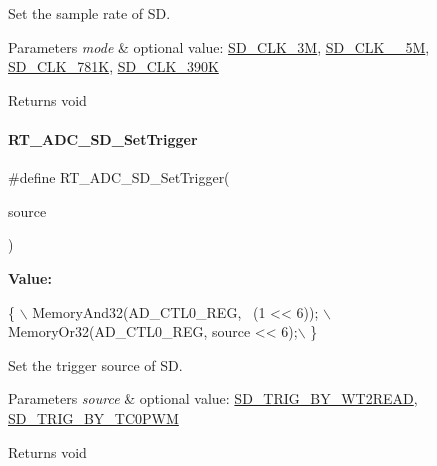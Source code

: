 Set the sample rate of SD. 


\begin{DoxyParams}{Parameters}
{\em mode} & optional value\+: \mbox{\hyperlink{a00002_aebc3424fa91b715741f0320561ecfbb0a720c5991be73063f5ab035440f26b486}{S\+D\+\_\+\+C\+L\+K\+\_\+3M}}, \mbox{\hyperlink{a00002_aebc3424fa91b715741f0320561ecfbb0a5241c8457df3f987f10797b36db20771}{S\+D\+\_\+\+C\+L\+K\+\_\+\_\+5M}}, \mbox{\hyperlink{a00002_aebc3424fa91b715741f0320561ecfbb0a37bbada3115f676b49cc087c5caac0d3}{S\+D\+\_\+\+C\+L\+K\+\_\+781K}}, \mbox{\hyperlink{a00002_aebc3424fa91b715741f0320561ecfbb0ace583ebd6e97c856a883187711ea4226}{S\+D\+\_\+\+C\+L\+K\+\_\+390K}} \\
\hline
\end{DoxyParams}
\begin{DoxyReturn}{Returns}
void 
\end{DoxyReturn}
\mbox{\label{a00002_a11bf38478bd196acd1f179115e714dfc}} 
\paragraph{\texorpdfstring{R\+T\+\_\+\+A\+D\+C\+\_\+\+S\+D\+\_\+\+Set\+Trigger}{RT\_ADC\_SD\_SetTrigger}}
{\footnotesize\ttfamily \#define R\+T\+\_\+\+A\+D\+C\+\_\+\+S\+D\+\_\+\+Set\+Trigger(\begin{DoxyParamCaption}\item[{}]{source }\end{DoxyParamCaption})}

{\bfseries Value\+:}
\begin{DoxyCode}
\{                                        \(\backslash\)
        MemoryAnd32(AD\_CTL0\_REG, ~(1 << 6)); \(\backslash\)
        MemoryOr32(AD\_CTL0\_REG, source << 6);\(\backslash\)
    \}
\end{DoxyCode}


Set the trigger source of SD. 


\begin{DoxyParams}{Parameters}
{\em source} & optional value\+: \mbox{\hyperlink{a00002_ab266bb772aaf5cffad6bede99cfb094ca9596adcc3a82f8e983e664a6ed5144a6}{S\+D\+\_\+\+T\+R\+I\+G\+\_\+\+B\+Y\+\_\+\+W\+T2\+R\+E\+AD}}, \mbox{\hyperlink{a00002_ab266bb772aaf5cffad6bede99cfb094ca2da9ae6568d907b90ab68f56f8605ada}{S\+D\+\_\+\+T\+R\+I\+G\+\_\+\+B\+Y\+\_\+\+T\+C0\+P\+WM}} \\
\hline
\end{DoxyParams}
\begin{DoxyReturn}{Returns}
void 
\end{DoxyReturn}
\mbox{\label{a00002_a312f152517ab50c1cda791e118dd4473}} 
